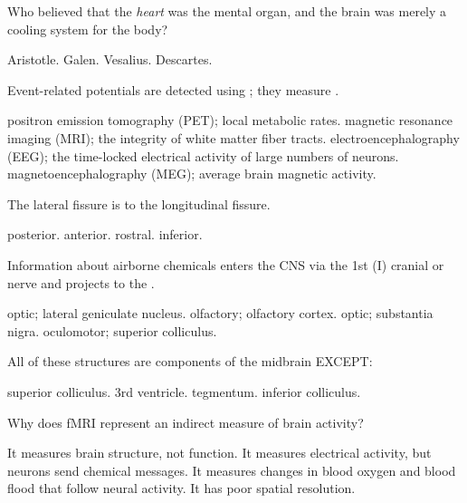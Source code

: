 \documentclass[]{exam}
\begin{document}
\begin{questions}
\question Who believed that the \emph{heart} was the mental organ, and the brain was merely a cooling system for the body?
\begin{choices}
\choice Aristotle.
\choice Galen.
\choice Vesalius.
\correctchoice Descartes.
\end{choices}

\newpage

\question Event-related potentials are detected using \fillin; they measure \fillin.
\begin{choices}
\choice positron emission tomography (PET); local metabolic rates.
\choice magnetic resonance imaging (MRI); the integrity of white matter fiber tracts.
\correctchoice electroencephalography (EEG); the time-locked electrical activity of large numbers of neurons.
\choice magnetoencephalography (MEG); average brain magnetic activity.
\end{choices}

\question The lateral fissure is \fillin to the longitudinal fissure.
\begin{choices}
\choice posterior.
\choice anterior.
\choice rostral.
\correctchoice inferior.
\end{choices}

\question Information about airborne chemicals enters the CNS via the 1st (I) cranial or \fillin nerve and projects to the \fillin.
\begin{choices}
\choice optic; lateral geniculate nucleus.
\correctchoice olfactory; olfactory cortex.
\choice optic; substantia nigra.
\choice oculomotor; superior colliculus.
\end{choices}


\question All of these structures are components of the midbrain EXCEPT:
\begin{choices}
\choice superior colliculus.
\correctchoice 3rd ventricle.
\choice tegmentum.
\choice inferior colliculus.
\end{choices}

\question Why does fMRI represent an indirect measure of brain activity?
\begin{choices}
\choice It measures brain structure, not function.
\choice It measures electrical activity, but neurons send chemical messages.
\correctchoice It measures changes in blood oxygen and blood flood that follow neural activity.
\choice It has poor spatial resolution.
\end{choices}


\end{questions}
\end{document}
